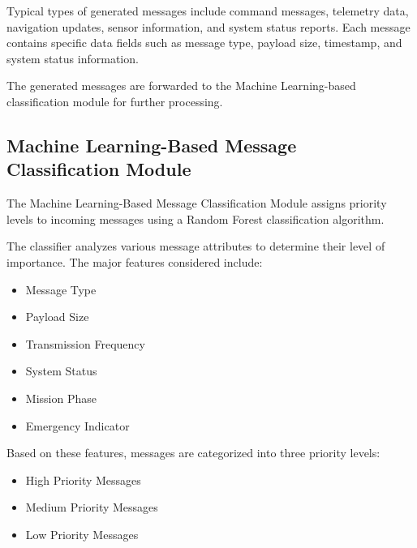 Typical types of generated messages include command messages, 
telemetry data, navigation updates, sensor information, and system 
status reports. Each message contains specific data fields such as 
message type, payload size, timestamp, and system status information.

The generated messages are forwarded to the Machine Learning-based 
classification module for further processing.


\subsection{Machine Learning-Based Message Classification Module}

The Machine Learning-Based Message Classification Module assigns 
priority levels to incoming messages using a Random Forest 
classification algorithm.

The classifier analyzes various message attributes to determine 
their level of importance. The major features considered include:

\begin{itemize}

\item Message Type

\item Payload Size

\item Transmission Frequency

\item System Status

\item Mission Phase

\item Emergency Indicator

\end{itemize}

Based on these features, messages are categorized into three 
priority levels:

\begin{itemize}

\item High Priority Messages

\item Medium Priority Messages

\item Low Priority Messages

\end{itemize}

